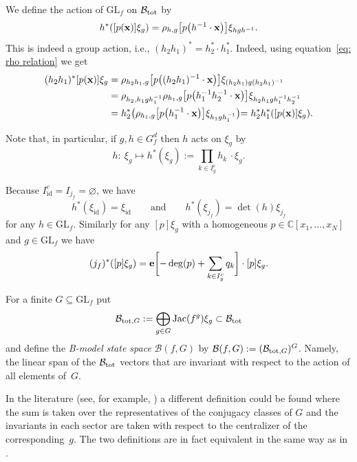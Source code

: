 \documentclass[10pt,a4paper]{amsart}
\numberwithin{equation}{section}
\newcommand{\CC}{{\mathbb{C}}}
\newcommand{\GL}{{\mathrm{GL}}}
\newcommand{\epi}{{\bf e}}
\newcommand{\Jac}{\mathrm{Jac}}
\newcommand{\id}{\mathrm{id}}
\newcommand{\bx}{{\bf x}}
\def\B{{\mathcal B}}
\begin{document}
We define the action of $\GL_f$ on $\B_{\rm tot}$ by
\begin{align*}
h^*([p(\bx)]\xi_{g})=\rho_{h,g}\bigl[p\bigl(h^{-1}\cdot\bx\bigl)\bigr]\xi_{hgh^{-1}}.
\end{align*}
This is indeed a group action, i.e., $(h_2h_1)^* = h_2^* \cdot h_1^*$. Indeed, using equation~\eqref{eq: rho relation} we get
\begin{align*}
(h_2h_1)^*[p(\bx)]\xi_{g} &=\rho_{h_2h_1,g}\bigl[p\bigl((h_2h_1)^{-1}\cdot\bx\bigr)\bigr]\xi_{(h_2h_1)g(h_2h_1)^{-1}}
\\ &=\rho_{h_2,h_1gh_1^{-1}}\rho_{h_1,g}\bigl[p\bigl(h_1^{-1}h_2^{-1}\cdot\bx\bigr)\bigr]\xi_{h_2h_1gh_1^{-1}h_2^{-1}}
\\ &=h_2^*\bigl(\rho_{h_1,g}\bigl[p\bigl(h_1^{-1}\cdot\bx\bigl)\bigl]\xi_{h_1gh_1^{-1}}\bigl)=h_2^*h_1^*([p(\bx)]\xi_{g}).
\end{align*}

Note that, in particular, if $g,h\in G_f^d$ then $h$ acts on $\xi_g$ by
\begin{equation*}%
	h\colon\ \xi_g\mapsto h^{*} (\xi_g) := \prod_{k\in I_g^c} h_k\,\cdot \xi_g.
\end{equation*}

\begin{Example}\label{ex: J--action and bigrading}
Because $I_\id^c = I_{j_f} = \varnothing$, we have
\[
 h^*(\xi_\id) = \xi_\id \qquad \text{and} \qquad h^*(\xi_{j_f}) = \det(h) \xi_{j_f}
\]
for any $h \in \GL_f$.
Similarly for any $[p]\xi_g$ with a homogeneous $p \in \CC[x_1,\dots,x_N]$ and $g\in \GL_f$ we have
\[
(j_f)^*([p]\xi_g) = \epi\biggl[-\deg(p) + \sum_{k \in I_g^c} q_k\biggr] \cdot [p]\xi_g.
\]
\end{Example}

For a finite $G \subseteq \GL_f$ put
\[\B_{{\rm tot},G}:=\bigoplus_{g \in G} \Jac(f^g) \xi_g\subset \B_{\rm tot}\]
and define the \textit{B-model state space} $\B(f,G)$ by
$\B(f,G) := ( \B_{{\rm tot},G} )^G$. Namely, the linear span of the $\B_{\rm tot}$ vectors that are invariant with respect to the action of all elements of~$G$.

\begin{Remark}
 In the literature (see, for example, \cite{Muk}) a different definition could be found where the sum is taken over the representatives of the conjugacy classes of $G$ and the invariants in each sector are taken with respect to the centralizer of the corresponding~$g$. The two definitions are in fact equivalent in the same way as in \cite[Proposition~42]{BI22}.
\end{Remark}
\end{document}
